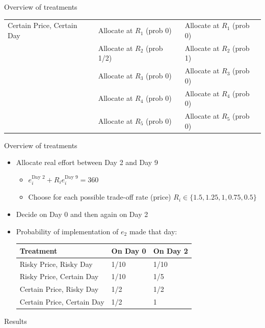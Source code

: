 \documentclass[professionalfont,10pt]{beamer}
\begin{document}
\begin{frame}{Overview of treatments}
{\begin{tabular}{lll}
Certain Price, Certain Day & Allocate at $R_1$ (prob 0)    & Allocate at $R_1$ (prob 0)   \\
     & Allocate at $R_2$ (prob \alert{1/2})  & Allocate at $R_2$ (prob \alert{1})   \\
     & Allocate at $R_3$ (prob 0)    & Allocate at $R_3$ (prob 0)   \\
     & Allocate at $R_4$ (prob 0)    & Allocate at $R_4$ (prob 0)   \\
     & Allocate at $R_5$ (prob 0)    & Allocate at $R_5$ (prob 0)   \\ \hline
\end{tabular}
}
\end{frame}

\begin{frame}{Overview of treatments}
\begin{itemize}
\item Allocate real effort between Day 2 and Day 9
\begin{itemize}
\item $e_i^\text{Day 2} + R_i e_i^\text{Day 9} = 360$
\item Choose for each possible trade-off rate (price) $R_i \in \{1.5, 1.25, 1, 0.75, 0.5\}$
\end{itemize}
\item Decide on Day 0 and then again on Day 2
\item Probability of implementation of $e_2$ made that day: \\
\vspace{1\baselineskip}
\begin{tabular}{lll}
\toprule
Treatment & On Day 0 & On Day 2 \\
\midrule
Risky Price, Risky Day     & 1/10 & 1/10 \\
Risky Price, Certain Day   & 1/10 & 1/5  \\
Certain Price, Risky Day   & 1/2  & 1/2  \\
Certain Price, Certain Day & 1/2  & 1    \\
\bottomrule
\end{tabular}
\end{itemize}
\end{frame}

\begin{frame}
\vfill
\begin{center}
{\Large Results}
\end{center}
\vfill
\end{frame}
\end{document}
